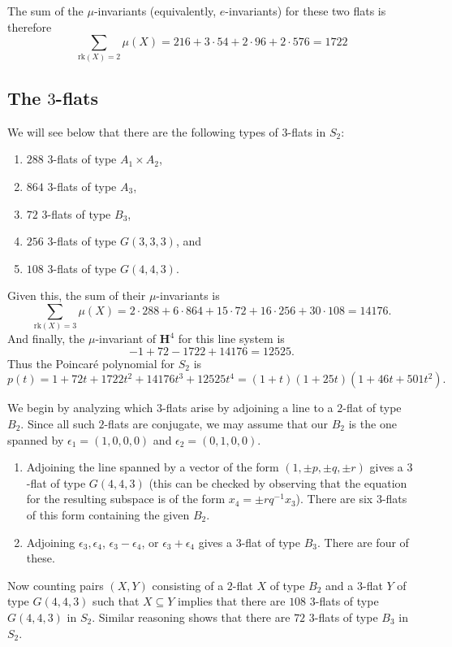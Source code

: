 \documentclass[11pt, reqno]{amsart}
\numberwithin{equation}{section}
\theoremstyle{definition}
\theoremstyle{plain}
\newcommand{\HH}{\mathbf{H}}
\begin{document}
The sum of the $\mu$-invariants (equivalently, $e$-invariants) for these two flats is therefore
$$\sum_{\mathrm{rk}(X)=2} \mu(X)=216+3\cdot54+2\cdot96+2\cdot 576=1722$$

\subsection{The $3$-flats} We will see below that there are the following types of $3$-flats in $S_2$:
\begin{enumerate}
\item[(a)] $288$ $3$-flats of type $A_1 \times A_2$,
\item[(b)] $864$ $3$-flats of type $A_3$,
\item[(c)] $72$ $3$-flats of type $B_3$, 
\item[(d)] $256$ $3$-flats of type $G(3,3,3)$, and
\item[(e)] $108$ $3$-flats of type $G(4,4,3)$.
\end{enumerate}

Given this, the sum of their $\mu$-invariants is
$$\sum_{\mathrm{rk}(X)=3} \mu(X)=2 \cdot 288+6\cdot864+15\cdot72+16\cdot256+30\cdot108=14176.$$ And finally, the $\mu$-invariant of $\HH^4$ for this line system is
$$-1+72-1722+14176=12525.$$ Thus the Poincar\'e polynomial for $S_2$ is
$$p(t)=1+72t+1722t^2+14176t^3+12525t^4=(1+t)(1+25t)(1+46t+501t^2).$$

We begin by analyzing which $3$-flats arise by adjoining a line to a $2$-flat of type $B_2$. Since all such $2$-flats are conjugate, we may assume that our $B_2$ is the one spanned by $\epsilon_1=(1,0,0,0)$ and $\epsilon_2=(0,1,0,0)$. 
\begin{enumerate}
\item[(a)] Adjoining the line spanned by a vector of the form $(1,\pm p,\pm q,\pm r)$ gives a $3$-flat of type $G(4,4,3)$ (this can be checked by observing that the equation for the resulting subspace is of the form $x_4=\pm r q^{-1} x_3$). There are six $3$-flats of this form containing the given $B_2$.
\item[(b)] Adjoining $\epsilon_3,\epsilon_4$, $\epsilon_3-\epsilon_4$, or $\epsilon_3+\epsilon_4$ gives a $3$-flat of type $B_3$. There are four of these.
\end{enumerate}

Now counting pairs $(X,Y)$ consisting of a $2$-flat $X$ of type $B_2$ and a  $3$-flat $Y$ of type $G(4,4,3)$ such that $X \subseteq Y$ implies that there are $108$ $3$-flats of type $G(4,4,3)$ in $S_2$. Similar reasoning shows that there are $72$ $3$-flats of type $B_3$ in $S_2$. 
\end{document}
